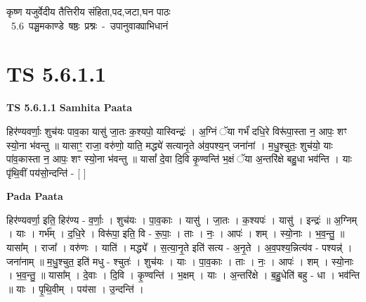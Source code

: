 \documentclass[17pt]{extarticle}
\begin{document}
\begin{titlepage}
    \begin{center}
 
\begin{sanskrit}
    { \Large
    कृष्ण यजुर्वेदीय तैत्तिरीय संहिता,पद,जटा,घन पाठः 
    }
    \\
    \vspace{2.5cm}
    \mbox{ \Large
    5.6      पञ्चमकाण्डे षष्ठः प्रश्नः - उपानुवाक्याभिधानं   }
\end{sanskrit}
\end{center}

\end{titlepage}
\tableofcontents
{}
\pagebreak


\section{ TS 5.6.1.1 }

\textbf{TS 5.6.1.1 } \newline
\textbf{Samhita Paata} \newline

हिर॑ण्यवर्णाः॒ शुच॑यः पाव॒का यासु॑ जा॒तः क॒श्यपो॒ यास्विन्द्रः॑ । अ॒ग्निं ॅया गर्भं॑ दधि॒रे विरू॑पा॒स्ता न॒ आपः॒ शꣳ स्यो॒ना भ॑वन्तु ॥ यासाꣳ॒॒ राजा॒ वरु॑णो॒ याति॒ मद्ध्ये॑ सत्यानृ॒ते अ॑व॒पश्य॒न् जना॑नां । म॒धु॒श्चुतः॒ शुच॑यो॒ याः पा॑व॒कास्ता न॒ आपः॒ शꣳ स्यो॒ना भ॑वन्तु ॥ यासां᳚ दे॒वा दि॒वि कृ॒ण्वन्ति॑ भ॒क्षं ॅया अ॒न्तरि॑क्षे बहु॒धा भव॑न्ति । याः पृ॑थि॒वीं पय॑सो॒न्दन्ति॑ - [  ] \newline

\textbf{Pada Paata} \newline

हिर॑ण्यवर्णा॒ इति॒ हिर॑ण्य - व॒र्णाः॒ । शुच॑यः । पा॒व॒काः । यासु॑ । जा॒तः । क॒श्यपः॑ । यासु॑ । इन्द्रः॑ ॥ अ॒ग्निम् । याः । गर्भ᳚म् । द॒धि॒रे । विरू॑पा॒ इति॒ वि - रू॒पाः॒ । ताः । नः॒ । आपः॑ । शम् । स्यो॒नाः । भ॒व॒न्तु॒ ॥ यासा᳚म् । राजा᳚ । वरु॑णः । याति॑ । मद्ध्ये᳚ । स॒त्या॒नृ॒ते इति॑ सत्य - अ॒नृ॒ते । अ॒व॒पश्य॒न्नित्य॑व - पश्यन्न्॑ । जना॑नाम् ॥ म॒धु॒श्चुत॒ इति॑ मधु - श्चुतः॑ । शुच॑यः । याः । पा॒व॒काः । ताः । नः॒ । आपः॑ । शम् । स्यो॒नाः । भ॒व॒न्तु॒ ॥ यासा᳚म् । दे॒वाः । दि॒वि । कृ॒ण्वन्ति॑ । भ॒क्षम् । याः । अ॒न्तरि॑क्षे । ब॒हु॒धेति॑ बहु - धा । भव॑न्ति ॥ याः । पृ॒थि॒वीम् । पय॑सा । उ॒न्दन्ति॑ ।  \newline




\end{document}
